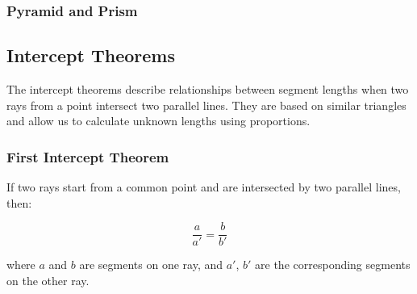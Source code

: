 \subsubsection{Pyramid and Prism}
\begin{center}
\end{center}

\subsection{Intercept Theorems}

The intercept theorems describe relationships between segment lengths when two rays from a point intersect two parallel lines. They are based on similar triangles and allow us to calculate unknown lengths using proportions.

\subsubsection{First Intercept Theorem}

If two rays start from a common point and are intersected by two parallel lines, then:

\[
\frac{a}{a'} = \frac{b}{b'}
\]

\noindent where \(a\) and \(b\) are segments on one ray, and \(a'\), \(b'\) are the corresponding segments on the other ray.

